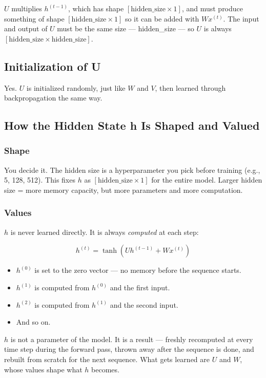 $U$ multiplies $h^{(t-1)}$, which has shape $[\text{hidden\_size} \times 1]$, and must produce something of shape $[\text{hidden\_size} \times 1]$ so it can be added with $W x^{(t)}$. The input and output of $U$ must be the same size --- hidden\_size --- so $U$ is always $[\text{hidden\_size} \times \text{hidden\_size}]$.


\subsection{Initialization of U}

Yes. $U$ is initialized randomly, just like $W$ and $V$, then learned through backpropagation the same way.


\subsection{How the Hidden State h Is Shaped and Valued}

\subsubsection{Shape}

You decide it. The hidden size is a hyperparameter you pick before training (e.g., 5, 128, 512). This fixes $h$ as $[\text{hidden\_size} \times 1]$ for the entire model. Larger hidden size = more memory capacity, but more parameters and more computation.

\subsubsection{Values}

$h$ is never learned directly. It is always \textit{computed} at each step:

\[
h^{(t)} = \tanh\!\left(U h^{(t-1)} + W x^{(t)}\right)
\]

\begin{itemize}
    \item $h^{(0)}$ is set to the zero vector --- no memory before the sequence starts.
    \item $h^{(1)}$ is computed from $h^{(0)}$ and the first input.
    \item $h^{(2)}$ is computed from $h^{(1)}$ and the second input.
    \item And so on.
\end{itemize}

$h$ is not a parameter of the model. It is a result --- freshly recomputed at every time step during the forward pass, thrown away after the sequence is done, and rebuilt from scratch for the next sequence. What gets learned are $U$ and $W$, whose values shape what $h$ becomes.



